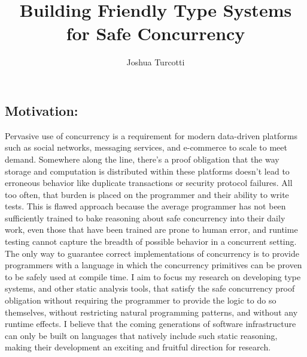 \documentclass{nsf-grfp}
\title{Building Friendly Type Systems for Safe Concurrency}
\author{Joshua Turcotti}
\begin{document}
\maketitle


\subsection*{Motivation:} Pervasive use of concurrency is a requirement for modern data-driven platforms such as social networks, messaging services, and e-commerce to scale to meet demand. Somewhere along the line, there's a proof obligation that the way storage and computation is distributed within these platforms doesn't lead to erroneous behavior like duplicate transactions or security protocol failures. All too often, that burden is placed on the programmer and their ability to write tests. This is flawed approach because the average programmer has not been sufficiently trained to bake reasoning about safe concurrency into their daily work, even those that have been trained are prone to human error, and runtime testing cannot capture the breadth of possible behavior in a concurrent setting. The only way to guarantee correct implementations of concurrency is to provide programmers with a language in which the concurrency primitives can be proven to be safely used at compile time. I aim to focus my research on developing type systems, and other static analysis tools, that satisfy the safe concurrency proof obligation without requiring the programmer to provide the logic to do so themselves, without restricting natural programming patterns, and without any runtime effects. I believe that the coming generations of software infrastructure can only be built on languages that natively include such static reasoning, making their development an exciting and fruitful direction for research.
\end{document}
